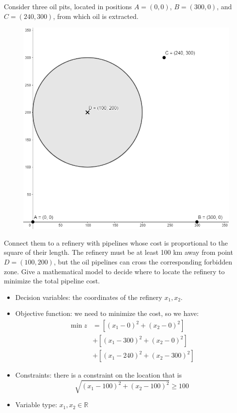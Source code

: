 \documentclass[12pt, a4paper]{report}
\newtheorem[style=M,bodystyle=\normalfont]{theorem}{Theorem}
\newtheorem[style=M,bodystyle=\normalfont]{corollary}{Corollary}
\newtheorem[style=M,bodystyle=\normalfont]{lemma}{Lemma}
\newtheorem[style=M,bodystyle=\normalfont]{definition}{Definition}
\begin{document}
    \begin{example}
        Consider three oil pits, located in positions $A=(0,0)$, $B=(300,0)$, and $C=(240,300)$, from which oil is extracted. 
        \begin{figure}[H]
            \centering
            \includegraphics[width=0.4\linewidth]{images/example3.png}
        \end{figure}
        Connect them to a refinery with pipelines whose cost is proportional to the square of their length. The refinery must be at least 100 km away from point $D=(100,200)$, but 
        the oil pipelines can cross the corresponding forbidden zone. Give a mathematical model to decide where to locate the refinery to minimize the total pipeline cost. 
        \begin{itemize}
            \item Decision variables: the coordinates of the refinery $x_1,x_2$. 
            \item Objective function: we need to minimize the cost, so we have: 
            \begin{align*}
                \min{z} &=\left[ (x_1-0)^2+(x_2-0)^2 \right] \\
                        &+ \left[ (x_1-300)^2+(x_2-0)^2 \right] \\
                        &+ \left[ (x_1-240)^2+(x_2-300)^2 \right] 
            \end{align*}
            \item Constraints: there is a constraint on the location that is
                \[\sqrt{{\left( x_1-100 \right)}^2+{\left( x_2-100 \right)}^2} \geq 100\]
            \item Variable type: $x_1,x_2 \in \mathbb{R}$
        \end{itemize}
    \end{example}
\end{document}
